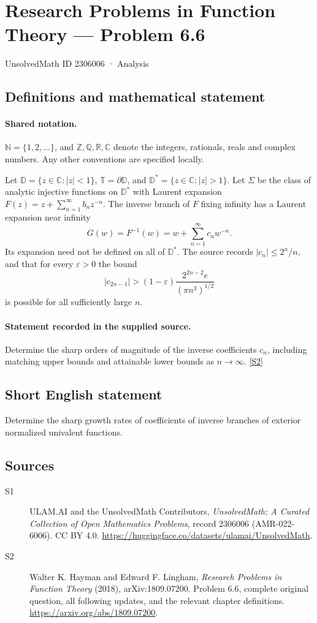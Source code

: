 \documentclass[11pt]{book}
\newcommand{\sref}[2]{\hyperlink{source:#1:#2}{[S#2]}}
\begin{document}
\setcounter{section}{2306005}
\section{Research Problems in Function Theory — Problem 6.6}\label{2306006}
{\small\sffamily UnsolvedMath ID 2306006 · Analysis}
\subsection{Definitions and mathematical statement}

\paragraph{Shared notation.}$\mathbb N=\{1,2,\ldots\}$, and $\mathbb Z,\mathbb Q,\mathbb R,\mathbb C$ denote the integers, rationals, reals and complex numbers. Any other conventions are specified locally.


Let $\mathbb D=\{z\in\mathbb C:|z|<1\}$, $\mathbb T=\partial\mathbb D$, and $\mathbb D^*=\{z\in\mathbb C:|z|>1\}$. Let $\Sigma$ be the class of analytic injective functions on $\mathbb D^*$ with Laurent expansion $F(z)=z+\sum_{n=1}^{\infty}b_nz^{-n}$. The inverse branch of $F$ fixing infinity has a Laurent expansion near infinity \[G(w)=F^{-1}(w)=w+\sum_{n=1}^{\infty}c_nw^{-n}.\] Its expansion need not be defined on all of $\mathbb D^*$. The source records $|c_n|\le2^n/n$, and that for every $\varepsilon>0$ the bound \[|c_{2n-1}|>(1-\varepsilon)\frac{2^{2n-2}e}{(\pi n^3)^{1/2}}\] is possible for all sufficiently large $n$.
\paragraph{Statement recorded in the supplied source.}
Determine the sharp orders of magnitude of the inverse coefficients $c_n$, including matching upper bounds and attainable lower bounds as $n\to\infty$. \sref{2306006}{2}
\subsection{Short English statement}
Determine the sharp growth rates of coefficients of inverse branches of exterior normalized univalent functions.
\subsection{Sources}
\begin{description}
\item[\hypertarget{source:2306006:1}{S1}] ULAM.AI and the UnsolvedMath Contributors, \emph{UnsolvedMath: A Curated Collection of Open Mathematics Problems}, record 2306006 (AMR-022-6006). CC BY 4.0. \url{https://huggingface.co/datasets/ulamai/UnsolvedMath}.
\item[\hypertarget{source:2306006:2}{S2}] Walter K. Hayman and Edward F. Lingham, \emph{Research Problems in Function Theory} (2018), arXiv:1809.07200. Problem 6.6, complete original question, all following updates, and the relevant chapter definitions. \url{https://arxiv.org/abs/1809.07200}.
\end{description}
\label{end:2306006}
\end{document}
